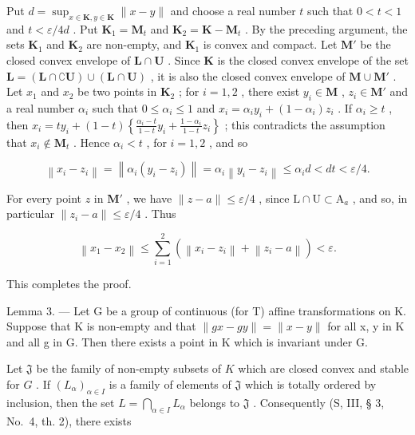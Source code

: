 Put \(d = \sup_{x \in \mathbf{K}, y \in \mathbf{K}} \| x - y \|\) and choose a real number \(t\) such that \(0 < t < 1\) and \(t < \varepsilon / 4d\) . Put \(\mathbf{K}_1 = \mathbf{M}_t\) and \(\mathbf{K}_2 = \mathbf{K} - \mathbf{M}_t\) . By the preceding argument, the sets \(\mathbf{K}_1\) and \(\mathbf{K}_2\) are non-empty, and \(\mathbf{K}_1\) is convex and compact. Let \(\mathbf{M}'\) be the closed convex envelope of \(\mathbf{L} \cap \mathbf{U}\) . Since \(\mathbf{K}\) is the closed convex envelope of the set \(\mathbf{L} = (\mathbf{L} \cap \complement \mathbf{U}) \cup (\mathbf{L} \cap \mathbf{U})\) , it is also the closed convex envelope of \(\mathbf{M} \cup \mathbf{M}'\) . Let \(x_1\) and \(x_2\) be two points in \(\mathbf{K}_2\) ; for \(i = 1, 2\) , there exist \(y_i \in \mathbf{M}\) , \(z_i \in \mathbf{M}'\) and a real number \(\alpha_i\) such that \(0 \leqslant \alpha_i \leqslant 1\) and \(x_i = \alpha_i y_i + (1 - \alpha_i) z_i\) . If \(\alpha_i \geqslant t\) , then \(x_i = ty_i + (1 - t) \left\{\frac{\alpha_i - t}{1 - t} y_i + \frac{1 - \alpha_i}{1 - t} z_i\right\}\) ; this contradicts the assumption that \(x_i \notin \mathbf{M}_t\) . Hence \(\alpha_i < t\) , for \(i = 1, 2\) , and so

\[
\left\| x _ {i} - z _ {i} \right\| = \left\| \alpha_ {i} \left(y _ {i} - z _ {i}\right) \right\| = \alpha_ {i} \left\| y _ {i} - z _ {i} \right\| \leqslant \alpha_ {i} d <   d t <   \varepsilon / 4.
\]

For every point \(z\) in \(\mathbf{M}'\) , we have \(\| z - a \| \leqslant \varepsilon / 4\) , since \(\mathrm{L} \cap \mathrm{U} \subset \mathrm{A}_a\) , and so, in particular \(\| z_i - a \| \leqslant \varepsilon / 4\) . Thus

\[
\left\| x _ {1} - x _ {2} \right\| \leqslant \sum_ {i = 1} ^ {2} \left(\left\| x _ {i} - z _ {i} \right\| + \left\| z _ {i} - a \right\|\right) <   \varepsilon .
\]

This completes the proof.

Lemma 3. --- Let G be a group of continuous (for T) affine transformations on K. Suppose that K is non-empty and that \(\|gx - gy\| = \|x - y\|\) for all x, y in K and all g in G. Then there exists a point in K which is invariant under G.

Let \(\mathfrak{J}\) be the family of non-empty subsets of \(K\) which are closed convex and stable for \(G\) . If \((L_{\alpha})_{\alpha \in I}\) is a family of elements of \(\mathfrak{J}\) which is totally ordered by inclusion, then the set \(L = \bigcap_{\alpha \in I} L_{\alpha}\) belongs to \(\mathfrak{J}\) . Consequently (S, III, § 3, No.~4, th. 2), there exists

